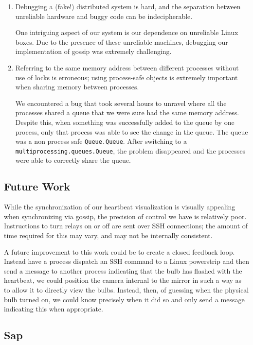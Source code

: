 \documentclass[preprint,review,12pt]{cs262}
\begin{document}
\begin{enumerate}
\item Debugging a (fake!) distributed system is hard, and the separation between unreliable hardware and buggy code can be indecipherable. 

One intriguing aspect of our system is our dependence on unreliable Linux boxes. Due to the presence of these unreliable machines, debugging our implementation of gossip was extremely challenging. 

\item Referring to the same memory address between different processes without use of locks is erroneous; using process-safe objects is extremely important when sharing memory between processes.

We encountered a bug that took several hours to unravel where all the processes shared a queue that we were sure had the same memory address. Despite this, when something was successfully added to the queue by one process, only that process was able to see the change in the queue. The queue was a non process safe \texttt{Queue.Queue}. After switching to a \texttt{multiprocessing.queues.Queue}, the problem disappeared and the processes were able to correctly share the queue.
\end{enumerate}

\subsection{Future Work} 

While the synchronization of our heartbeat visualization is visually appealing when synchronizing via gossip, the precision of control we have is relatively poor. Instructions to turn relays on or off are sent over SSH connections; the amount of time required for this may vary, and may not be internally consistent. 

A future improvement to this work could be to create a closed feedback loop. Instead have a process dispatch an SSH command to a Linux powerstrip and then send a message to another process indicating that the bulb has flashed with the heartbeat, we could position the camera internal to the mirror in such a way as to allow it to directly view the bulbs. Instead, then, of guessing when the physical bulb turned on, we could know precisely when it did so and only send a message indicating this when appropriate. 

\subsection{Sap}
\end{document}

